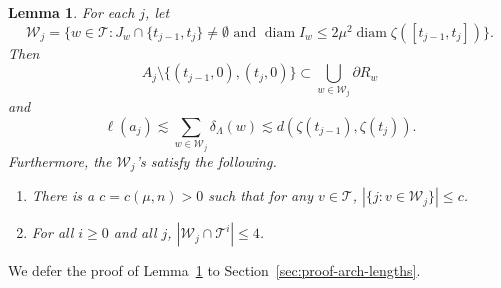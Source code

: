 \documentclass[12pt,reqno]{amsart}
\newcommand{\cT}{\mathcal{T}}
\newcommand{\cW}{\mathcal{W}}
\newtheorem{lemma}[thm]{Lemma}
\theoremstyle{remark}
\newcommand{\0}{\mathbf{0}}
\renewcommand{\1}{\mathbf 1}
\DeclareMathOperator{\diam}{diam}
\begin{document}
\begin{lemma}\label{lem:arch-lengths}
  For each $j$, let
  \begin{equation}\label{eq:def-cwj}
    \cW_j = \{w\in \cT : J_w\cap \{t_{j-1},t_j\} \ne \emptyset \text{ and } \diam I_w \le 2 \mu^2 \diam \zeta([t_{j-1},t_j])\}.
  \end{equation}
  Then 
  \begin{equation}\label{eq:boundary-graph}
    A_j\setminus \{(t_{j-1},0), (t_{j},0)\} \subset \bigcup_{w\in \cW_j} \partial R_w
  \end{equation}
  and 
  \begin{equation}\label{eq:alpha-length}
    \ell(a_j) \lesssim \sum_{w\in \cW_j} \delta_\Lambda(w) \lesssim  d(\zeta(t_{j-1}),\zeta(t_j)).
  \end{equation}
  Furthermore, the $\cW_j$'s satisfy the following.
  \begin{enumerate}
  \item\label{it:W-multiplicity}
    There is a $c = c(\mu,n) >0$ such that for any $v\in \cT$, $|\{j : v\in \cW_j\}|\le c$.
  \item\label{it:arch-count}
    For all $i\ge 0$ and all $j$, $|\cW_j \cap \cT^i| \le 4$.
  \end{enumerate}
\end{lemma}

We defer the proof of Lemma~\ref{lem:arch-lengths} to Section~\ref{sec:proof-arch-lengths}.
\end{document}
